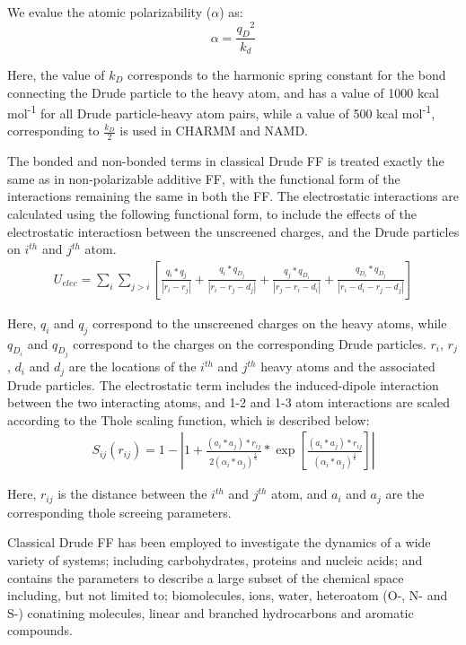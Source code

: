      We evalue the atomic polarizability ($\alpha$) as:
     \begin{equation*}
        \alpha  =   \frac{{q_D}^2}{k_d}
     \end{equation*}

    Here, the value of $k_D$ corresponds to the harmonic spring constant for the bond connecting the Drude particle to the heavy atom, and has a value of 1000 kcal mol\textsuperscript{-1} for all Drude particle-heavy atom pairs, while a value of 500 kcal mol\textsuperscript{-1}, corresponding to $\frac{k_D}{2}$ is used in CHARMM and NAMD.

    The bonded and non-bonded terms in classical Drude FF is treated exactly the same as in non-polarizable additive FF, with the functional form of the interactions remaining the same in both the FF. The electrostatic interactions are calculated using the following functional form, to include the effects of the electrostatic interactiosn between the unscreened charges, and the Drude particles on $i^{th}$ and $j^{th}$ atom. 
    \begin{align*}
        U_{elec} = \sum_{i}^{}\sum_{j>i}^{}\left[\frac{q_i * q_j}{|r_i - r_j|} + \frac{q_i * q_{D_j}}{|r_i - r_j - d_j|} + \frac{q_j * q_{D_i}}{|r_j - r_i - d_i|} + \frac{q_{D_i} * q_{D_j}}{|r_i - d_i - r_j - d_j|}\right]
    \end{align*}

    Here, $q_i$ and $q_j$ correspond to the unscreened charges on the heavy atoms, while $q_{D_i}$ and $q_{D_j}$ correspond to the charges on the corresponding Drude particles. $r_i$, $r_j$, $d_i$ and $d_j$ are the locations of the $i^{th}$ and $j^{th}$ heavy atoms and the associated Drude particles. The electrostatic term includes the induced-dipole interaction between the two interacting atoms, and 1-2 and 1-3 atom interactions are scaled according to the Thole scaling function, which is described below:
    \begin{align*}
        S_{ij}(r_{ij}) = 1 - \left| 1 + \frac{(a_i * a_j)*r_{ij}}{2(\alpha_i*\alpha_j)^{\frac{1}{6}}}*\exp{\left[\frac{(a_i * a_j)*r_{ij}}{(\alpha_i * \alpha_j)^{\frac{1}{6}}}\right]} \right|
    \end{align*} 

    Here, $r_{ij}$ is the distance between the $i^{th}$ and $j^{th}$ atom, and $a_i$ and $a_j$ are the corresponding thole screeing parameters.

    Classical Drude FF has been employed to investigate the dynamics of a wide variety of systems; including carbohydrates\supercite{pandey_drude_2019,kognole_extension_2022}, proteins and nucleic acids; and contains the parameters to describe a large subset of the chemical space including, but not limited to; biomolecules\supercite{baker_development_2011,savelyev_all-atom_2014}, ions\supercite{lin_polarizable_2018}, water\supercite{lamoureux_polarizable_2006}, heteroatom (O-, N- and S-) conatining molecules\supercite{lopes_polarizable_2009,zhu_polarizable_2010,he_polarizable_2013}, linear and branched hydrocarbons\supercite{vorobyov_polarizable_2005} and aromatic compounds\supercite{lopes_polarizable_2007}.

